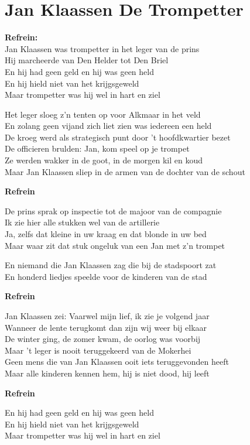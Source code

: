 \section{Jan Klaassen De Trompetter}
\textbf{Refrein:}\\
Jan Klaassen was trompetter in het leger van de prins\\
Hij marcheerde van Den Helder tot Den Briel\\
En hij had geen geld en hij was geen held\\
En hij hield niet van het krijgsgeweld\\
Maar trompetter was hij wel in hart en ziel

Het leger sloeg z'n tenten op voor Alkmaar in het veld\\
En zolang geen vijand zich liet zien was iedereen een held\\
De kroeg werd als strategisch punt door 't hoofdkwartier bezet\\
De officieren brulden: Jan, kom speel op je trompet\\
Ze werden wakker in de goot, in de morgen kil en koud\\
Maar Jan Klaassen sliep in de armen van de dochter van de schout

\textbf{Refrein}

De prins sprak op inspectie tot de majoor van de compagnie\\
Ik zie hier alle stukken wel van de artillerie\\
Ja, zelfs dat kleine in uw kraag en dat blonde in uw bed\\
Maar waar zit dat stuk ongeluk van een Jan met z'n trompet

En niemand die Jan Klaassen zag die bij de stadspoort zat\\
En honderd liedjes speelde voor de kinderen van de stad

\textbf{Refrein}

Jan Klaassen zei: Vaarwel mijn lief, ik zie je volgend jaar\\
Wanneer de lente terugkomt dan zijn wij weer bij elkaar\\
De winter ging, de zomer kwam, de oorlog was voorbij\\
Maar 't leger is nooit teruggekeerd van de Mokerhei\\
Geen mens die van Jan Klaassen ooit iets teruggevonden heeft\\
Maar alle kinderen kennen hem, hij is niet dood, hij leeft

\textbf{Refrein}

En hij had geen geld en hij was geen held\\
En hij hield niet van het krijgsgeweld\\
Maar trompetter was hij wel in hart en ziel

